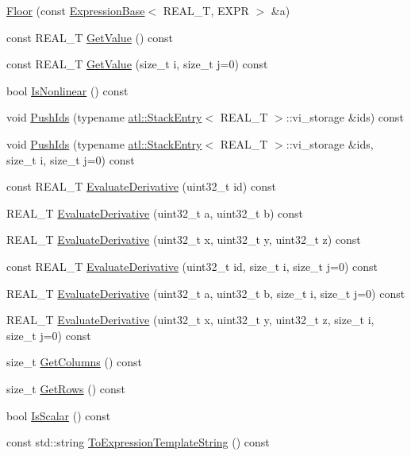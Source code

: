 \begin{DoxyCompactItemize}
\item 
\hyperlink{structatl_1_1_floor_aef10e331b5a8dfd105d4625834805ed5}{Floor} (const \hyperlink{structatl_1_1_expression_base}{Expression\+Base}$<$ R\+E\+A\+L\+\_\+\+T, E\+X\+P\+R $>$ \&a)
\item 
const R\+E\+A\+L\+\_\+\+T \hyperlink{structatl_1_1_floor_a0ba9ceb76ef311d1e744fd33ab5e26a0}{Get\+Value} () const 
\item 
const R\+E\+A\+L\+\_\+\+T \hyperlink{structatl_1_1_floor_abb51bf2e1df3e1aaa608e2fe1d8f4b6c}{Get\+Value} (size\+\_\+t i, size\+\_\+t j=0) const 
\item 
bool \hyperlink{structatl_1_1_floor_ae166074543f85f765c5de9596b39eff8}{Is\+Nonlinear} () const 
\item 
void \hyperlink{structatl_1_1_floor_a00a63079149c6ba771d85003063555a1}{Push\+Ids} (typename \hyperlink{structatl_1_1_stack_entry}{atl\+::\+Stack\+Entry}$<$ R\+E\+A\+L\+\_\+\+T $>$\+::vi\+\_\+storage \&ids) const 
\item 
void \hyperlink{structatl_1_1_floor_a163741875a38d29e0f8bae05690ecee2}{Push\+Ids} (typename \hyperlink{structatl_1_1_stack_entry}{atl\+::\+Stack\+Entry}$<$ R\+E\+A\+L\+\_\+\+T $>$\+::vi\+\_\+storage \&ids, size\+\_\+t i, size\+\_\+t j=0) const 
\item 
const R\+E\+A\+L\+\_\+\+T \hyperlink{structatl_1_1_floor_a57802c11d13cc65b6b4c5277c166fcec}{Evaluate\+Derivative} (uint32\+\_\+t id) const 
\item 
R\+E\+A\+L\+\_\+\+T \hyperlink{structatl_1_1_floor_afd7244e0957f110672b9f796df384cd2}{Evaluate\+Derivative} (uint32\+\_\+t a, uint32\+\_\+t b) const 
\item 
R\+E\+A\+L\+\_\+\+T \hyperlink{structatl_1_1_floor_a7819c933ee40dfdda197cf0a84815d3f}{Evaluate\+Derivative} (uint32\+\_\+t x, uint32\+\_\+t y, uint32\+\_\+t z) const 
\item 
const R\+E\+A\+L\+\_\+\+T \hyperlink{structatl_1_1_floor_a7b1680974460bb030aad835bd78a0e15}{Evaluate\+Derivative} (uint32\+\_\+t id, size\+\_\+t i, size\+\_\+t j=0) const 
\item 
R\+E\+A\+L\+\_\+\+T \hyperlink{structatl_1_1_floor_a6116d4e32adb9d748bdf346f1e6df82a}{Evaluate\+Derivative} (uint32\+\_\+t a, uint32\+\_\+t b, size\+\_\+t i, size\+\_\+t j=0) const 
\item 
R\+E\+A\+L\+\_\+\+T \hyperlink{structatl_1_1_floor_a4f6cf89a00ef56ca69c487891f62edb9}{Evaluate\+Derivative} (uint32\+\_\+t x, uint32\+\_\+t y, uint32\+\_\+t z, size\+\_\+t i, size\+\_\+t j=0) const 
\item 
size\+\_\+t \hyperlink{structatl_1_1_floor_aed881508e0865ed92d3e7106ece635c3}{Get\+Columns} () const 
\item 
size\+\_\+t \hyperlink{structatl_1_1_floor_adfa56c6c6bafc644dc6c5379b7eee93f}{Get\+Rows} () const 
\item 
bool \hyperlink{structatl_1_1_floor_ac16d9a293b83387f2250c3d5c8355bea}{Is\+Scalar} () const 
\item 
const std\+::string \hyperlink{structatl_1_1_floor_a285e4e518da19e29e0bcfe72de5c6f47}{To\+Expression\+Template\+String} () const 
\end{DoxyCompactItemize}
